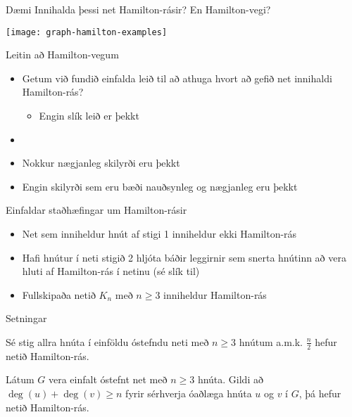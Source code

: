 \documentclass{beamer}
\begin{document}
\begin{frame}{Dæmi}
Innihalda þessi net Hamilton-rásir? En Hamilton-vegi?
\begin{center}
\texttt{[image: graph-hamilton-examples]}
\end{center}

\end{frame}


\begin{frame}{Leitin að Hamilton-vegum}
\begin{itemize}
 \item Getum við fundið einfalda leið til að athuga hvort að gefið net innihaldi Hamilton-rás? \pause
 \begin{itemize}
  \item Engin slík leið er þekkt
 \end{itemize}
 \item 
 \item Nokkur nægjanleg skilyrði eru þekkt
 \item Engin skilyrði sem eru bæði nauðsynleg og nægjanleg eru þekkt
\end{itemize}
\end{frame}

\begin{frame}{Einfaldar staðhæfingar um Hamilton-rásir}
\begin{itemize}[<+->]
 \item Net sem inniheldur hnút af stigi 1 inniheldur ekki Hamilton-rás
 \item Hafi hnútur í neti stigið 2 hljóta báðir leggirnir sem snerta hnútinn að vera hluti af Hamilton-rás í netinu (sé slík til)
 \item Fullskipaða netið $K_n$ með $n \geq 3$ inniheldur Hamilton-rás
\end{itemize}
\end{frame}

\begin{frame}{Setningar}
\begin{tcolorbox}[title=Setning Diracs]
Sé stig allra hnúta í einföldu óstefndu neti með $n \geq 3$ hnútum a.m.k. $\frac{n}{2}$ hefur netið Hamilton-rás.
\end{tcolorbox}
\begin{tcolorbox}[title=Setning Ores]
Látum $G$ vera einfalt óstefnt net með $n \geq 3$ hnúta. Gildi að $\deg(u) + \deg(v) \geq n$ fyrir sérhverja óaðlæga hnúta $u$ og $v$ í $G$, þá hefur netið Hamilton-rás.
\end{tcolorbox}
\end{frame}
\end{document}
